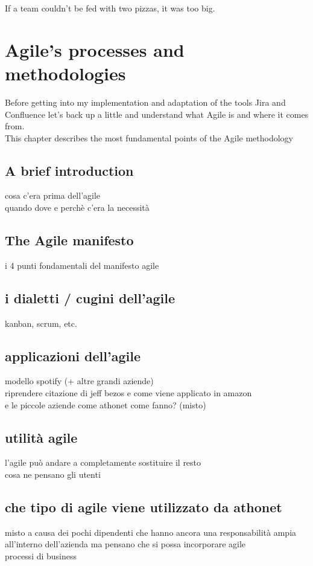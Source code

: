 \begin{savequote}[75mm]
If a team couldn’t be fed with two pizzas, it was too big.
\end{savequote}

\chapter{Agile's processes and methodologies}

Before getting into my implementation and adaptation of the tools Jira and Confluence let's back up a little and understand what Agile is and where it comes from.\\
This chapter describes the most fundamental points of the Agile methodology

\section{A brief introduction}
	cosa c'era prima dell'agile\\
	quando dove e perchè c'era la necessità

\section{The Agile manifesto}
	i 4 punti fondamentali del manifesto agile

\section{i dialetti / cugini dell'agile}
	kanban, scrum, etc.

\section{applicazioni dell'agile }
	modello spotify (+ altre grandi aziende)\\
	riprendere citazione di jeff bezos e come viene applicato in amazon\\
	e le piccole aziende come athonet come fanno? (misto)

\section{utilità agile}
	l'agile può andare a completamente sostituire il resto\\
	cosa ne pensano gli utenti

\section{che tipo di agile viene utilizzato da athonet}
	misto a causa dei pochi dipendenti che hanno ancora una responsabilità ampia all'interno dell'azienda ma pensano che si possa incorporare agile\\
	processi di business

